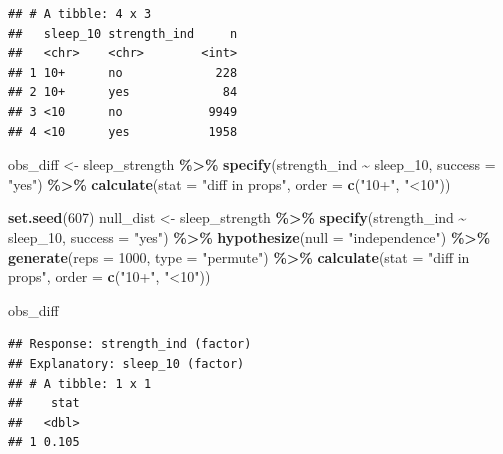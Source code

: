 \documentclass[
]{article}
\newenvironment{Shaded}{\begin{snugshade}}{\end{snugshade}}
\newcommand{\AttributeTok}[1]{\textcolor[rgb]{0.13,0.29,0.53}{#1}}
\newcommand{\DecValTok}[1]{\textcolor[rgb]{0.00,0.00,0.81}{#1}}
\newcommand{\FunctionTok}[1]{\textcolor[rgb]{0.13,0.29,0.53}{\textbf{#1}}}
\newcommand{\NormalTok}[1]{#1}
\newcommand{\OtherTok}[1]{\textcolor[rgb]{0.56,0.35,0.01}{#1}}
\newcommand{\SpecialCharTok}[1]{\textcolor[rgb]{0.81,0.36,0.00}{\textbf{#1}}}
\newcommand{\StringTok}[1]{\textcolor[rgb]{0.31,0.60,0.02}{#1}}
\begin{document}
\begin{verbatim}
## # A tibble: 4 x 3
##   sleep_10 strength_ind     n
##   <chr>    <chr>        <int>
## 1 10+      no             228
## 2 10+      yes             84
## 3 <10      no            9949
## 4 <10      yes           1958
\end{verbatim}

\begin{Shaded}
\begin{Highlighting}[]
\NormalTok{obs\_diff }\OtherTok{\textless{}{-}}\NormalTok{ sleep\_strength }\SpecialCharTok{\%\textgreater{}\%}
  \FunctionTok{specify}\NormalTok{(strength\_ind }\SpecialCharTok{\textasciitilde{}}\NormalTok{ sleep\_10, }\AttributeTok{success =} \StringTok{"yes"}\NormalTok{) }\SpecialCharTok{\%\textgreater{}\%}
  \FunctionTok{calculate}\NormalTok{(}\AttributeTok{stat =} \StringTok{"diff in props"}\NormalTok{, }\AttributeTok{order =} \FunctionTok{c}\NormalTok{(}\StringTok{"10+"}\NormalTok{, }\StringTok{"\textless{}10"}\NormalTok{))}
\end{Highlighting}
\end{Shaded}

\begin{Shaded}
\begin{Highlighting}[]
\FunctionTok{set.seed}\NormalTok{(}\DecValTok{607}\NormalTok{)}
\NormalTok{null\_dist }\OtherTok{\textless{}{-}}\NormalTok{ sleep\_strength }\SpecialCharTok{\%\textgreater{}\%}
  \FunctionTok{specify}\NormalTok{(strength\_ind }\SpecialCharTok{\textasciitilde{}}\NormalTok{ sleep\_10, }\AttributeTok{success =} \StringTok{"yes"}\NormalTok{) }\SpecialCharTok{\%\textgreater{}\%}
  \FunctionTok{hypothesize}\NormalTok{(}\AttributeTok{null =} \StringTok{"independence"}\NormalTok{) }\SpecialCharTok{\%\textgreater{}\%}
  \FunctionTok{generate}\NormalTok{(}\AttributeTok{reps =} \DecValTok{1000}\NormalTok{, }\AttributeTok{type =} \StringTok{"permute"}\NormalTok{) }\SpecialCharTok{\%\textgreater{}\%}
  \FunctionTok{calculate}\NormalTok{(}\AttributeTok{stat =} \StringTok{"diff in props"}\NormalTok{, }\AttributeTok{order =} \FunctionTok{c}\NormalTok{(}\StringTok{"10+"}\NormalTok{, }\StringTok{"\textless{}10"}\NormalTok{))}

\NormalTok{obs\_diff}
\end{Highlighting}
\end{Shaded}

\begin{verbatim}
## Response: strength_ind (factor)
## Explanatory: sleep_10 (factor)
## # A tibble: 1 x 1
##    stat
##   <dbl>
## 1 0.105
\end{verbatim}
\end{document}
